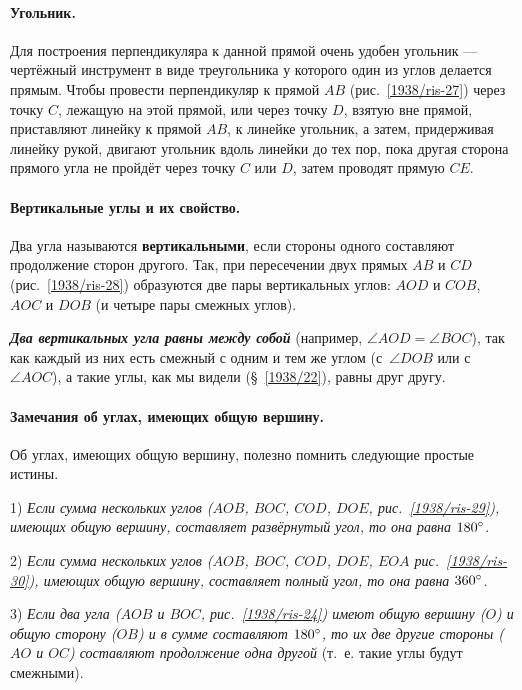 \documentclass[oneside]{book}
\begin{document}
\paragraph{Угольник.}\label{1938/25} 
Для построения перпендикуляра к данной прямой очень удобен угольник — чертёжный инструмент в виде треугольника у которого один из углов делается прямым.
Чтобы провести перпендикуляр к прямой $AB$ (рис.~\ref{1938/ris-27}) через точку $C$, лежащую на этой прямой, или через точку $D$, взятую вне прямой, приставляют линейку к прямой $AB$, к линейке угольник, а затем, придерживая линейку рукой, двигают угольник вдоль линейки до тех пор, пока другая сторона прямого угла не пройдёт через точку $C$ или $D$, затем проводят прямую $CE$.

\paragraph{Вертикальные углы и их свойство.}\label{1938/26}
Два угла называются \textbf{вертикальными}, если стороны одного составляют продолжение сторон другого.
Так, при пересечении двух прямых $AB$ и $CD$ (рис.~\ref{1938/ris-28}) образуются две пары вертикальных углов:
$AOD$ и $COB$, $AOC$ и $DOB$ (и четыре пары смежных углов).

\textbf{\emph{Два вертикальных угла равны между собой}} (например, $\angle AOD = \angle BOC$), так как каждый из них есть смежный с одним и тем же углом (с~$\angle DOB$ или с~$\angle AOC$), а такие углы, как мы видели (§~\ref{1938/22}), равны друг другу.

\paragraph{Замечания об углах, имеющих общую вершину.}\label{1938/27}
Об углах, имеющих общую вершину, полезно помнить следующие простые истины.

1) \emph{Если сумма нескольких углов ($AOB$, $BOC$, $COD$, $DOE$, рис.~\ref{1938/ris-29}), имеющих общую вершину, составляет развёрнутый угол, то она равна $180\degree$.}

2) \emph{Если сумма нескольких углов ($AOB$, $BOC$, $COD$, $DOE$, $EOA$ рис.~\ref{1938/ris-30}), имеющих общую вершину, составляет полный угол, то она равна  $360\degree$.}

3) \emph{Если два угла ($AOB$ и $BOC$, рис.~\ref{1938/ris-24}) имеют общую вершину ($O$) и общую сторону ($OB$) и в сумме составляют $180\degree$, то их две другие стороны ($AO$ и $OC$) составляют продолжение одна другой} (т.~е. такие углы будут смежными).
\end{document}
